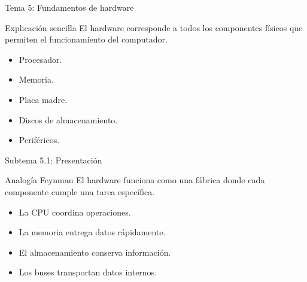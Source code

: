 \documentclass[10pt,aspectratio=169]{beamer}
\begin{document}
	
	\begin{frame}{Tema 5: Fundamentos de hardware}
		
		\begin{block}{Explicación sencilla}
			El hardware corresponde a todos los componentes físicos que permiten el funcionamiento del computador.
		\end{block}
		
		\begin{itemize}
			\item Procesador.
			\item Memoria.
			\item Placa madre.
			\item Discos de almacenamiento.
			\item Periféricos.
		\end{itemize}
		
	\end{frame}
	
	
	\begin{frame}{Subtema 5.1: Presentación}
		
		\begin{block}{Analogía Feynman}
			El hardware funciona como una fábrica donde cada componente cumple una tarea específica.
		\end{block}
		
		\begin{itemize}
			\item La CPU coordina operaciones.
			\item La memoria entrega datos rápidamente.
			\item El almacenamiento conserva información.
			\item Los buses transportan datos internos.
		\end{itemize}
		
	\end{frame}
	
	
\end{document}
